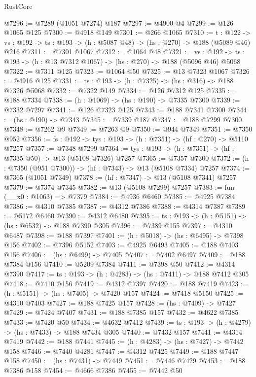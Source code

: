 \begin{lexlean}{RustCore}
\begin{coremodule}
@7296 := @7289 (@1051 @7274) @187
@7297 := @4900 @4
@7299 := @126 @1065 @125
@7300 := @4918 @149
@7301 := @266 @1065
@7310 := {t : @122} ->
  {vs : @192} -> {ts : @193} -> (h : @5087 @48) -> (hs : @270) -> @188 (@5089 @46) @216
@7311 := @7301 @1067
@7312 := @1064 @48
@7321 := {vs : @192} ->
  {ts : @193} -> (h : @13 @7312 @1067) -> (hs : @270) -> @188 (@5096 @46) @5068
@7322 := @7311 @125
@7323 := @1064 @50
@7325 := @13 @7323 @1067
@7326 := @4916 @125
@7331 := {ts : @193} -> (h : @7325) -> (hs : @316) -> @188 @7326 @5068
@7332 := @7322 @149
@7334 := @126 @7312 @125
@7335 := @188 @7334
@7338 := (h : @1069) -> (hs : @190) -> @7335 @7300
@7339 := @7332 @7297
@7341 := @126 @7323 @125
@7343 := @188 @7341 @7300
@7344 := (hs : @190) -> @7343
@7345 := @7339 @187
@7347 := @188 @7299 @7300
@7348 := @7262 @9
@7349 := @7263 @9
@7350 := @944 @7349
@7351 := @7350 @952
@7356 := {fs : @192} -> {tys : @193} -> (h : @7351) -> (hf : @270) -> @5110 @7257
@7357 := @7348 @7299
@7364 := {tys : @193} -> (h : @7351) -> (hf : @7335 @50) -> @13 (@5108 @7326) @7257
@7365 := @7357 @7300
@7372 := (h : @7350 (@951 @7300)) -> (hf : @7343) -> @13 (@5108 @7334) @7257
@7374 := @7365 (@1051 @7349)
@7378 := (hf : @7347) -> @13 (@5108 @7341) @7257
@7379 := @7374 @7345
@7382 := @13 (@5108 @7299) @7257
@7383 := fun (__x0 : @1063) => @7379
@7384 := @4936 @6460
@7385 := @4925 @7384
@7386 := @4310 @7385
@7387 := @4312 @7386
@7388 := @4314 @7387
@7389 := @5172 @6460
@7390 := @4312 @6480
@7395 := {ts : @193} -> (h : @5151) -> (hs : @6532) -> @188 @7390 @305
@7396 := @7389 @155
@7397 := @4310 @6487
@7398 := @188 @7397
@7401 := (h : @5018) -> (hs : @6495) -> @7398 @156
@7402 := @7396 @5152
@7403 := @4925 @6493
@7405 := @188 @7403 @156
@7406 := (hs : @6499) -> @7405
@7407 := @7402 @6497
@7409 := @188 @7384 @156
@7410 := @5209 @7384
@7411 := @7398 @50
@7412 := @4314 @7390
@7417 := {ts : @193} -> (h : @4283) -> (hs : @7411) -> @188 @7412 @305
@7418 := @7410 @156
@7419 := @4312 @7397
@7420 := @188 @7419
@7423 := (h : @5151) -> (hs : @7405) -> @7420 @157
@7424 := @7418 @5150
@7425 := @4310 @7403
@7427 := @188 @7425 @157
@7428 := (hs : @7409) -> @7427
@7429 := @7424 @7407
@7431 := @188 @7385 @157
@7432 := @4622 @7385
@7433 := @7420 @50
@7434 := @4632 @7412
@7439 := {ts : @193} -> (h : @4279) -> (hs : @7433) -> @188 @7434 @305
@7440 := @7432 @157
@7441 := @4314 @7419
@7442 := @188 @7441
@7445 := (h : @4283) -> (hs : @7427) -> @7442 @158
@7446 := @7440 @4281
@7447 := @4312 @7425
@7449 := @188 @7447 @158
@7450 := (hs : @7431) -> @7449
@7451 := @7446 @7429
@7453 := @188 @7386 @158
@7454 := @4666 @7386
@7455 := @7442 @50

\end{coremodule}
\end{lexlean}
